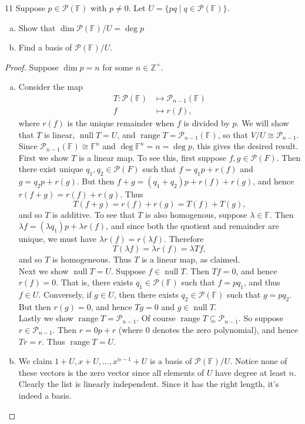 \documentclass{extarticle}
\newenvironment{problem}[1]{\begin{prob*}{#1}{}}{\end{prob*}}
\newcommand{\Z}{\mathbb{Z}}
\newcommand{\F}{\mathbb{F}}
\newcommand{\poly}{\mathcal{P}}
\DeclareMathOperator{\Null}{null}
\DeclareMathOperator{\Range}{range}
\begin{document}
\begin{problem}{11}
Suppose $p\in\poly(\F)$ with $p\neq 0$.  Let $U=\{pq\mid q\in\poly(\F)\}$.
\begin{enumerate}[(a)]
\item Show that $\dim\poly(\F)/U = \deg p$
\item Find a basis of $\poly(\F)/U$.
\end{enumerate}
\end{problem}
\begin{proof}
Suppose $\dim p=n$ for some $n\in\Z^+$.
\begin{enumerate}[(a)]
\item Consider the map
\begin{align*}
T:\poly(\F) &\mapsto \poly_{n-1}(\F)\\
f &\mapsto r(f),
\end{align*}
where $r(f)$ is the unique remainder when $f$ is divided by $p$.  We will show that $T$ is linear, $\Null T = U$, and $\Range T = \poly_{n - 1}(\F)$, so that $V/U\cong \poly_{n - 1}$.  Since $\poly_{n-1}(\F)\cong \F^n$ and $\deg\F^n = n = \deg p$, this gives the desired result.
\indent First we show $T$ is a linear map.  To see this, first suppose $f,g\in\poly(F)$.  Then there exist unique $q_1,q_2\in\poly(F)$ such that $f = q_1p + r(f)$ and $g = q_2p + r(g)$.  But then $f + g = (q_1 + q_2)p + r(f) + r(g)$, and hence $r(f+g) = r(f)+r(g)$.  Thus
\begin{equation*}
T(f + g) = r(f) + r(g) = T(f) + T(g),
\end{equation*}
and so $T$ is additive.  To see that $T$ is also homogenous, suppose $\lambda\in\F$.  Then $\lambda f = (\lambda q_1)p + \lambda r(f)$, and since both the quotient and remainder are unique, we must have $\lambda r(f) = r(\lambda f)$.  Therefore
\begin{equation*}
T(\lambda f) = \lambda r(f) = \lambda Tf,
\end{equation*}
and so $T$ is homogeneous.  Thus $T$ is a linear map, as claimed.\\
\indent Next we show $\Null T= U$.  Suppose $f\in \Null T$.  Then $Tf = 0$, and hence $r(f) = 0$.  That is, there exists $q_1\in \poly(\F)$ such that $f = pq_1$, and thus $f\in U$.  Conversely, if $g\in U$, then there exists $q_2\in\poly(\F)$ such that $g = pq_2$.  But then $r(g)=0$, and hence $Tg =0$ and $g\in\Null T$.\\
\indent Lastly we show $\Range T = \poly_{n-1}$.  Of course $\Range T\subseteq \poly_{n-1}$.  So suppose $r \in \poly_{n-1}$.  Then $r = 0p + r$ (where $0$ denotes the zero polynomial), and hence $Tr = r$.  Thus $\Range T = U$.
\item We claim $1+U, x+U,\dots, x^{n-1}+U$ is a basis of $\poly(\F)/U$.  Notice none of these vectors is the zero vector since all elements of $U$ have degree at least $n$.  Clearly the list is linearly independent.  Since it has the right length, it's indeed a basis.  \qedhere
\end{enumerate}
\end{proof}
\end{document}
